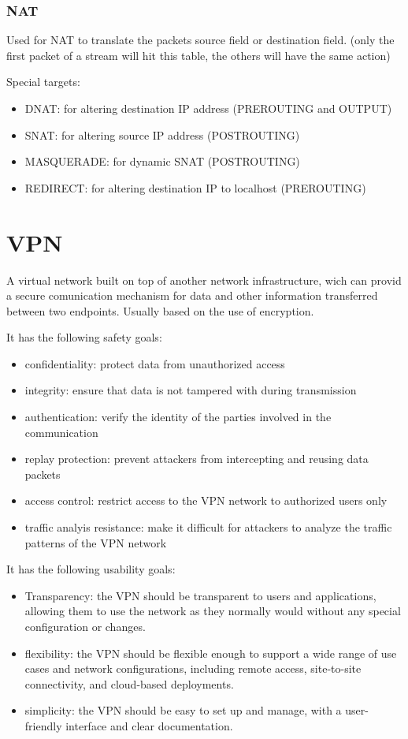 \subsection{NAT}
Used for NAT to translate the packets source field or destination field. (only the first packet of a stream will hit this table, the others will have the same action)

Special targets:
\begin{itemize}
    \item DNAT: for altering destination IP address (PREROUTING and OUTPUT)
    \item SNAT: for altering source IP address (POSTROUTING)
    \item MASQUERADE: for dynamic SNAT (POSTROUTING)
    \item REDIRECT: for altering destination IP to localhost (PREROUTING)
\end{itemize}

\chapter{VPN}
A virtual network built on top of another network infrastructure, wich can provid a secure
comunication mechanism for data and other information transferred between two endpoints. 
Usually based on the use of encryption.

It has the following safety goals:
\begin{itemize}
    \item confidentiality: protect data from unauthorized access
    \item integrity: ensure that data is not tampered with during transmission
    \item authentication: verify the identity of the parties involved in the communication
    \item replay protection: prevent attackers from intercepting and reusing data packets
    \item access control: restrict access to the VPN network to authorized users only
    \item traffic analyis resistance: make it difficult for attackers to analyze the traffic patterns of the VPN network
\end{itemize}

It has the following usability goals:
\begin{itemize}
    \item Transparency: the VPN should be transparent to users and applications, allowing them to use the network as they normally would without any special configuration or changes.
    \item flexibility: the VPN should be flexible enough to support a wide range of use cases and network configurations, including remote access, site-to-site connectivity, and cloud-based deployments.
    \item simplicity: the VPN should be easy to set up and manage, with a user-friendly interface and clear documentation.
\end{itemize}

